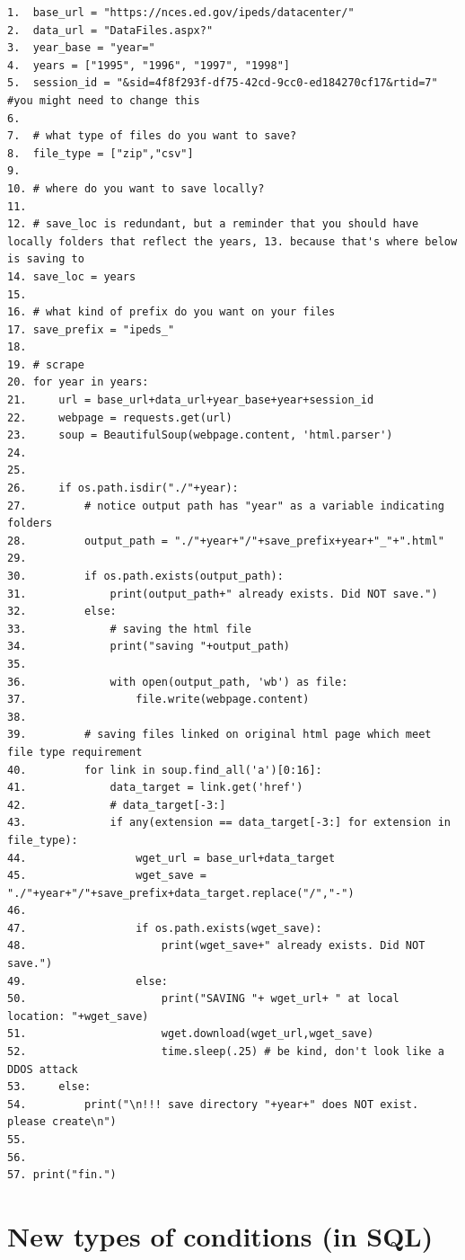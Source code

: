 \documentclass[
]{book}
\begin{document}
\begin{verbatim}
1.  base_url = "https://nces.ed.gov/ipeds/datacenter/"
2.  data_url = "DataFiles.aspx?"
3.  year_base = "year="
4.  years = ["1995", "1996", "1997", "1998"]
5.  session_id = "&sid=4f8f293f-df75-42cd-9cc0-ed184270cf17&rtid=7"  #you might need to change this
6. 
7.  # what type of files do you want to save?
8.  file_type = ["zip","csv"]
9. 
10. # where do you want to save locally?
11. 
12. # save_loc is redundant, but a reminder that you should have locally folders that reflect the years, 13. because that's where below is saving to
14. save_loc = years 
15. 
16. # what kind of prefix do you want on your files
17. save_prefix = "ipeds_" 
18. 
19. # scrape
20. for year in years:
21.     url = base_url+data_url+year_base+year+session_id 
22.     webpage = requests.get(url)
23.     soup = BeautifulSoup(webpage.content, 'html.parser')
24. 
25. 
26.     if os.path.isdir("./"+year):
27.         # notice output path has "year" as a variable indicating folders
28.         output_path = "./"+year+"/"+save_prefix+year+"_"+".html"
29.     
30.         if os.path.exists(output_path):
31.             print(output_path+" already exists. Did NOT save.")
32.         else:
33.             # saving the html file
34.             print("saving "+output_path)
35.     
36.             with open(output_path, 'wb') as file:
37.                 file.write(webpage.content) 
38.             
39.         # saving files linked on original html page which meet file type requirement
40.         for link in soup.find_all('a')[0:16]:  
41.             data_target = link.get('href')
42.             # data_target[-3:]
43.             if any(extension == data_target[-3:] for extension in file_type):
44.                 wget_url = base_url+data_target
45.                 wget_save = "./"+year+"/"+save_prefix+data_target.replace("/","-")
46.     
47.                 if os.path.exists(wget_save):
48.                     print(wget_save+" already exists. Did NOT save.")
49.                 else:
50.                     print("SAVING "+ wget_url+ " at local location: "+wget_save)
51.                     wget.download(wget_url,wget_save)
52.                     time.sleep(.25) # be kind, don't look like a DDOS attack
53.     else:
54.         print("\n!!! save directory "+year+" does NOT exist. please create\n")
55.     
56.     
57. print("fin.")
\end{verbatim}

\section{New types of conditions (in SQL)}\label{new-types-of-conditions-in-sql}
\end{document}

